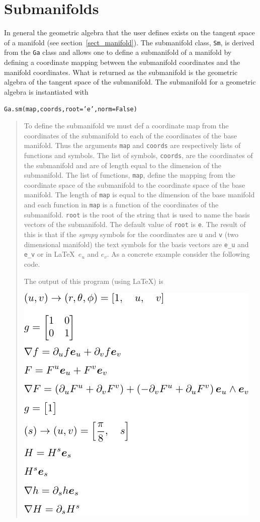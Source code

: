 \documentclass[12pt]{report}
\newcommand{\T}[1]{\texttt{#1}}
\newcommand{\includecode}[1]{}
\begin{document}
\section{Submanifolds}

In general the geometric algebra that the user defines exists on the tangent space of
a manifold (see section~\ref{sect_manifold}).  The submanifold class, \T{Sm}, is derived from
the \T{Ga} class and allows one
to define a submanifold of a manifold by defining a coordinate mapping between the submanifold
coordinates and the manifold coordinates.  What is returned as the submanifold is the geometric
algebra of the tangent space of the submanifold. The submanifold for a geometric algebra is
instantiated with

\T{Ga.sm(map,coords,root='e',norm=False)}
\begin{quote}
    To define the submanifold we must def a coordinate map from the coordinates of the submanifold to
    each of the coordinates of the base manifold.  Thus the arguments \T{map} and \T{coords} are
    respectively lists of functions and symbols.  The list of symbols, \T{coords}, are the coordinates of the
    submanifold and are of length equal to the dimension of the submanifold.  The list of functions, \T{map},
    define the mapping from the coordinate space of the submanifold to the coordinate space of the
    base manifold.  The length of \T{map} is equal to the dimension of the base manifold and each function in
    \T{map} is a function of the coordinates of the submanifold. \T{root} is the root of the string that is
    used to name the basis vectors of the submanifold.  The default value of \T{root} is \T{e}.  The result of
    this is that if the \emph{sympy} symbols for the coordinates are \T{u} and \T{v} (two dimensional manifold) the
    text symbols for the basis vectors are \T{e\_u} and \T{e\_v} or in \LaTeX\,  $e_{u}$ and $e_{v}$.  As a
    concrete example consider the following code.
    \includecode{python/submanifold.py}
    The output of this program (using \LaTeX) is
    \begin{center}
    \includegraphics[scale=0.9]{python/submanifold.pdf}
    \end{center}


\end{quote}
\end{document}
